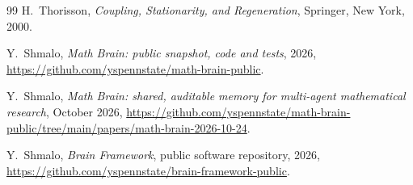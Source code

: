 \documentclass[11pt]{amsart}
\theoremstyle{remark}
\numberwithin{equation}{section}
\begin{document}
\begin{thebibliography}{99}
 H.~Thorisson, \emph{Coupling, Stationarity, and Regeneration}, Springer, New York, 2000.

 Y.~Shmalo, \emph{Math Brain: public snapshot, code and tests}, 2026, \url{https://github.com/yspennstate/math-brain-public}.

 Y.~Shmalo, \emph{Math Brain: shared, auditable memory for multi-agent mathematical research}, October 2026, \url{https://github.com/yspennstate/math-brain-public/tree/main/papers/math-brain-2026-10-24}.

 Y.~Shmalo, \emph{Brain Framework}, public software repository, 2026, \url{https://github.com/yspennstate/brain-framework-public}.

\end{thebibliography}
\end{document}
